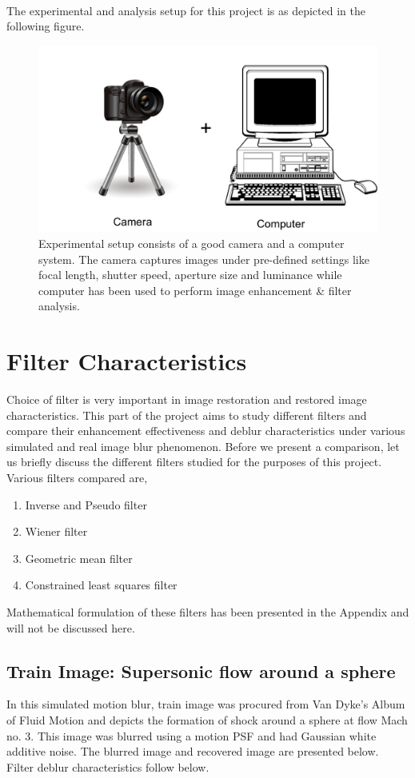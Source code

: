 \documentclass{report}
\begin{document}
\\
The experimental and analysis setup for this project is as depicted in the following figure.
\begin{figure}[h!]
  \centering
                \centering
                \includegraphics[width=.5\textwidth]{experimental_setup.png}
                \caption{Experimental setup consists of a good camera and a computer system. The camera captures images under pre-defined settings like focal length, shutter speed, aperture size and luminance while computer has been used to perform image enhancement \& filter analysis.}
                \end{figure}

\chapter{Filter Characteristics}
 Choice of filter is very important in image restoration and restored image characteristics. This part of the project aims to study different filters and compare their enhancement effectiveness and deblur characteristics under various simulated and real image blur phenomenon. Before we present a comparison, let us briefly discuss the different filters studied for the purposes of this project. Various filters compared are, 
\begin{enumerate}
\item Inverse and Pseudo filter
\item Wiener filter
\item Geometric mean filter
\item Constrained least squares filter
\end{enumerate} 
Mathematical formulation of these filters has been presented in the Appendix and will not be discussed here. 
\section{Train Image: Supersonic flow around a sphere}
In this simulated motion blur, train image was procured from Van Dyke's Album of Fluid Motion and depicts the formation of shock around a sphere at flow Mach no. 3. This image was blurred using a motion PSF and had Gaussian white additive noise. The blurred image and recovered image are presented below. Filter deblur characteristics follow below.
\end{document}
